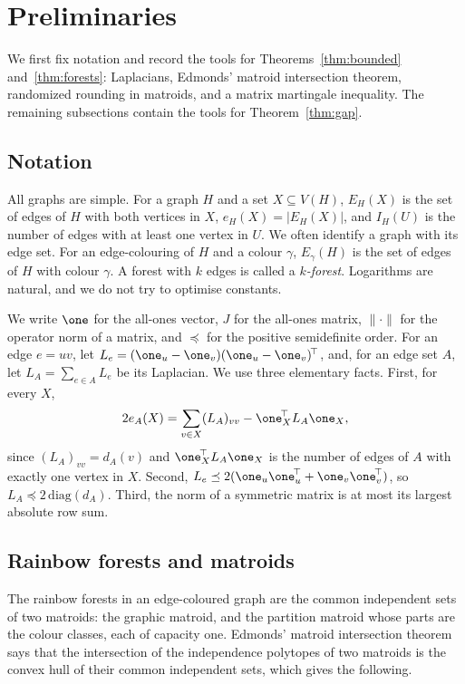 \section{Preliminaries}\label{sec:prelim}
We first fix notation and record the tools for Theorems~\ref{thm:bounded} and~\ref{thm:forests}: Laplacians, Edmonds' matroid intersection theorem, randomized rounding in matroids, and a matrix martingale inequality. The remaining subsections contain the tools for Theorem~\ref{thm:gap}.

\subsection{Notation}\label{sec:notation}
All graphs are simple. For a graph $H$ and a set $X\subseteq V(H)$, $E_H(X)$ is the set of edges of $H$ with both vertices in $X$, $e_H(X)=|E_H(X)|$, and $I_H(U)$ is the number of edges with at least one vertex in $U$. We often identify a graph with its edge set. For an edge-colouring of $H$ and a colour $\gamma$, $E_\gamma(H)$ is the set of edges of $H$ with colour $\gamma$. A forest with $k$ edges is called a \emph{$k$-forest}. Logarithms are natural, and we do not try to optimise constants.

We write $\one$ for the all-ones vector, $J$ for the all-ones matrix, $\|\cdot\|$ for the operator norm of a matrix, and $\preceq$ for the positive semidefinite order. For an edge $e=uv$, let $L_e=(\one_u-\one_v)(\one_u-\one_v)^{\!\top}$, and, for an edge set $A$, let $L_A=\sum_{e\in A}L_e$ be its Laplacian. We use three elementary facts. First, for every $X$,
\begin{equation}\label{eq:edgecount}
2e_A(X)=\sum_{v\in X}(L_A)_{vv}-\one_X^{\!\top}L_A\one_X,
\end{equation}
since $(L_A)_{vv}=d_A(v)$ and $\one_X^{\!\top}L_A\one_X$ is the number of edges of $A$ with exactly one vertex in $X$. Second, $L_e\preceq2(\one_u\one_u^{\!\top}+\one_v\one_v^{\!\top})$, so $L_A\preceq2\,\mathrm{diag}(d_A)$. Third, the norm of a symmetric matrix is at most its largest absolute row sum.

\subsection{Rainbow forests and matroids}\label{sec:matroids}
The rainbow forests in an edge-coloured graph are the common independent sets of two matroids: the graphic matroid, and the partition matroid whose parts are the colour classes, each of capacity one. Edmonds' matroid intersection theorem~\cite{Edm} says that the intersection of the independence polytopes of two matroids is the convex hull of their common independent sets, which gives the following.

